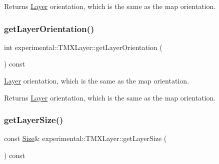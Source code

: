 \begin{DoxyReturn}{Returns}
\hyperlink{classLayer}{Layer} orientation, which is the same as the map orientation. 
\end{DoxyReturn}
\mbox{\label{classexperimental_1_1TMXLayer_a88cf778cbb137e03d2eec76d5f221825}} 
\subsubsection{\texorpdfstring{get\+Layer\+Orientation()}{getLayerOrientation()}\hspace{0.1cm}{\footnotesize\ttfamily [2/2]}}
{\footnotesize\ttfamily int experimental\+::\+T\+M\+X\+Layer\+::get\+Layer\+Orientation (\begin{DoxyParamCaption}{ }\end{DoxyParamCaption}) const\hspace{0.3cm}{\ttfamily [inline]}}

\hyperlink{classLayer}{Layer} orientation, which is the same as the map orientation.

\begin{DoxyReturn}{Returns}
\hyperlink{classLayer}{Layer} orientation, which is the same as the map orientation. 
\end{DoxyReturn}
\mbox{\label{classexperimental_1_1TMXLayer_a052a2a0dce9610b40cf6b7323bdcef5b}} 
\subsubsection{\texorpdfstring{get\+Layer\+Size()}{getLayerSize()}\hspace{0.1cm}{\footnotesize\ttfamily [1/2]}}
{\footnotesize\ttfamily const \hyperlink{classSize}{Size}\& experimental\+::\+T\+M\+X\+Layer\+::get\+Layer\+Size (\begin{DoxyParamCaption}{ }\end{DoxyParamCaption}) const\hspace{0.3cm}{\ttfamily [inline]}}

